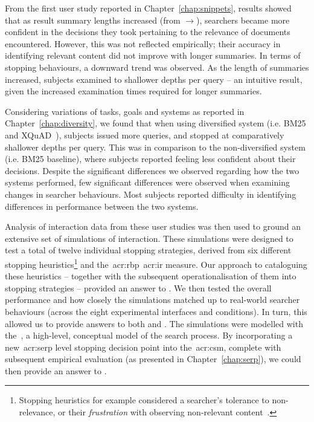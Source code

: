 From the first user study reported in Chapter~\ref{chap:snippets}, results showed that as result summary lengths increased (from $\rightarrow$), searchers became more confident in the decisions they took pertaining to the relevance of documents encountered. However, this was not reflected empirically; their accuracy in identifying relevant content did not improve with longer summaries. In terms of stopping behaviours, a downward trend was observed. As the length of summaries increased, subjects examined to shallower depths per query -- an intuitive result, given the increased examination times required for longer summaries.

Considering variations of tasks, goals and systems as reported in Chapter~\ref{chap:diversity}, we found that when using diversified system  (i.e. BM25 and XQuAD~\citep{santos2010query_reformulations_diversification}), subjects issued more queries, and stopped at comparatively shallower depths per query. This was in comparison to the non-diversified system  (i.e. BM25 baseline), where subjects reported feeling less confident about their decisions. Despite the significant differences we observed regarding how the two systems performed, few significant differences were observed when examining changes in searcher behaviours. Most subjects reported difficulty in identifying differences in performance between the two systems.

Analysis of interaction data from these user studies was then used to ground an extensive set of simulations of interaction. These simulations were designed to test a total of twelve individual stopping strategies, derived from six different stopping heuristics\footnote{Stopping heuristics for example considered a searcher's tolerance to non-relevance, or their \emph{frustration} with observing non-relevant content~\citep{kraft1979stopping_rules}.} and the~\gls{acr:rbp}~\gls{acr:ir} measure. Our approach to cataloguing these heuristics -- together with the subsequent operationalisation of them into stopping strategies -- provided an answer to . We then tested the overall performance and how closely the simulations matched up to real-world searcher behaviours (across the eight experimental interfaces and conditions). In turn, this allowed us to provide answers to both  and . The simulations were modelled with the~, a high-level, conceptual model of the search process. By incorporating a new~\gls{acr:serp} level stopping decision point into the~\gls{acr:csm}, complete with subsequent empirical evaluation (as presented in Chapter~\ref{chap:serp}), we could then provide an answer to .

